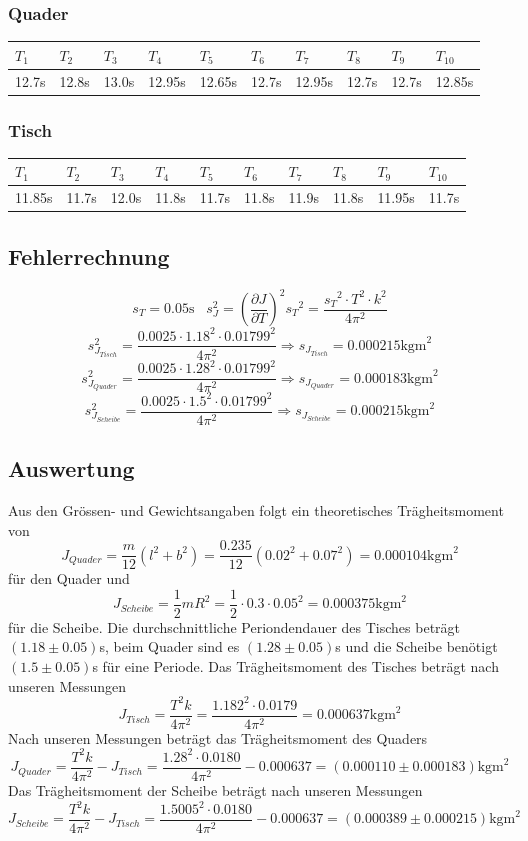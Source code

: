 \documentclass[12pt,a4paper]{article}
\begin{document}
\subsubsection*{Quader}
\begin{tabular}{|l|l|l|l|l|l|l|l|l|l|}
\hline
$T_{1}$&$T_{2}$&$T_{3}$&$T_{4}$&$T_{5}$&$T_{6}$&$T_{7}$&$T_{8}$&$T_{9}$&$T_{10}$\\
\hline
12.7s&12.8s&13.0s&12.95s&12.65s&12.7s&12.95s&12.7s&12.7s&12.85s\\
\hline
\end{tabular}

\subsubsection*{Tisch}
\begin{tabular}{|l|l|l|l|l|l|l|l|l|l|}
\hline
$T_{1}$&$T_{2}$&$T_{3}$&$T_{4}$&$T_{5}$&$T_{6}$&$T_{7}$&$T_{8}$&$T_{9}$&$T_{10}$\\
\hline
11.85s&11.7s&12.0s&11.8s&11.7s&11.8s&11.9s&11.8s&11.95s&11.7s\\
\hline
\end{tabular}

\subsection*{Fehlerrechnung}
\[ s_{T} = 0.05\mbox{s} \hspace{10pt} s_{J}^2 = \left( \frac{\partial J}{\partial T} \right)^2 {s_{T}}^2 = \frac{{s_{T}}^2 \cdot T^2 \cdot k^2}{4 \pi^2} \]
\[ s_{J_{Tisch}}^2 = \frac{0.0025 \cdot 1.18^2 \cdot 0.01799^2}{4 \pi^2} \Rightarrow s_{J_{Tisch}} = 0.000215 \mbox{kgm}^2 \]
\[ s_{J_{Quader}}^2 = \frac{0.0025 \cdot 1.28^2 \cdot 0.01799^2}{4 \pi^2} \Rightarrow s_{J_{Quader}} = 0.000183 \mbox{kgm}^2 \]
\[ s_{J_{Scheibe}}^2 = \frac{0.0025 \cdot 1.5^2 \cdot 0.01799^2}{4 \pi^2} \Rightarrow s_{J_{Scheibe}} = 0.000215 \mbox{kgm}^2 \]

\subsection*{Auswertung}
Aus den Gr\"ossen- und Gewichtsangaben folgt ein theoretisches Tr\"agheitsmoment von
\[ J_{Quader} = \frac{m}{12}(l^2 + b^2) = \frac{0.235}{12}(0.02^2 + 0.07^2) = 0.000104 \mbox{kgm}^2 \]
f\"ur den Quader und
\[  J_{Scheibe} = \frac{1}{2}mR^2 = \frac{1}{2} \cdot 0.3 \cdot 0.05^2 = 0.000375 \mbox{kgm}^2 \]
f\"ur die Scheibe.
Die durchschnittliche Periondendauer des Tisches betr\"agt $(1.18 \pm 0.05) $s, beim Quader sind es $(1.28 \pm 0.05)$s und die Scheibe ben\"otigt $(1.5 \pm 0.05)$s f\"ur eine Periode.
Das Tr\"agheitsmoment des Tisches betr\"agt nach unseren Messungen
\[ J_{Tisch} = \frac{T^2k}{4\pi^2} = \frac{1.182^2 \cdot 0.0179}{4\pi^2} = 0.000637 \mbox{kgm}^2\]
Nach unseren Messungen betr\"agt das Tr\"agheitsmoment des Quaders
\[ J_{Quader} = \frac{T^2k}{4\pi^2} - J_{Tisch} = \frac{1.28^2 \cdot 0.0180}{4\pi^2} - 0.000637 = (0.000110 \pm 0.000183) \mbox{kgm}^2 \]
Das Tr\"agheitsmoment der Scheibe betr\"agt nach unseren Messungen
\[ J_{Scheibe} = \frac{T^2k}{4\pi^2} - J_{Tisch} = \frac{1.5005^2 \cdot 0.0180}{4\pi^2} - 0.000637 = (0.000389 \pm 0.000215)  \mbox{kgm}^2 \]
\end{document}
